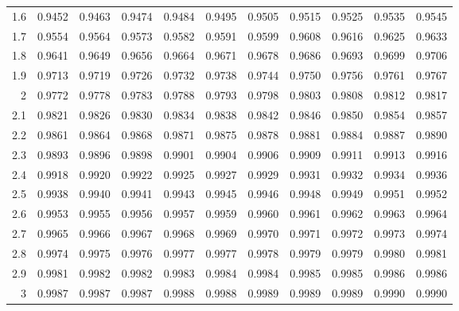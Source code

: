 \documentclass{article}
\begin{document}
\begin{center}
\begin{table}[ht]
\begin{tabular}{rrrrrrrrrrr}
  1.6 & 0.9452 & 0.9463 & 0.9474 & 0.9484 & 0.9495 & 0.9505 & 0.9515 & 0.9525 & 0.9535 & 0.9545 \\ 
  1.7 & 0.9554 & 0.9564 & 0.9573 & 0.9582 & 0.9591 & 0.9599 & 0.9608 & 0.9616 & 0.9625 & 0.9633 \\ 
  1.8 & 0.9641 & 0.9649 & 0.9656 & 0.9664 & 0.9671 & 0.9678 & 0.9686 & 0.9693 & 0.9699 & 0.9706 \\ 
  1.9 & 0.9713 & 0.9719 & 0.9726 & 0.9732 & 0.9738 & 0.9744 & 0.9750 & 0.9756 & 0.9761 & 0.9767 \\ 
  2 & 0.9772 & 0.9778 & 0.9783 & 0.9788 & 0.9793 & 0.9798 & 0.9803 & 0.9808 & 0.9812 & 0.9817 \\ 
  2.1 & 0.9821 & 0.9826 & 0.9830 & 0.9834 & 0.9838 & 0.9842 & 0.9846 & 0.9850 & 0.9854 & 0.9857 \\ 
  2.2 & 0.9861 & 0.9864 & 0.9868 & 0.9871 & 0.9875 & 0.9878 & 0.9881 & 0.9884 & 0.9887 & 0.9890 \\ 
  2.3 & 0.9893 & 0.9896 & 0.9898 & 0.9901 & 0.9904 & 0.9906 & 0.9909 & 0.9911 & 0.9913 & 0.9916 \\ 
  2.4 & 0.9918 & 0.9920 & 0.9922 & 0.9925 & 0.9927 & 0.9929 & 0.9931 & 0.9932 & 0.9934 & 0.9936 \\ 
  2.5 & 0.9938 & 0.9940 & 0.9941 & 0.9943 & 0.9945 & 0.9946 & 0.9948 & 0.9949 & 0.9951 & 0.9952 \\ 
  2.6 & 0.9953 & 0.9955 & 0.9956 & 0.9957 & 0.9959 & 0.9960 & 0.9961 & 0.9962 & 0.9963 & 0.9964 \\ 
  2.7 & 0.9965 & 0.9966 & 0.9967 & 0.9968 & 0.9969 & 0.9970 & 0.9971 & 0.9972 & 0.9973 & 0.9974 \\ 
  2.8 & 0.9974 & 0.9975 & 0.9976 & 0.9977 & 0.9977 & 0.9978 & 0.9979 & 0.9979 & 0.9980 & 0.9981 \\ 
  2.9 & 0.9981 & 0.9982 & 0.9982 & 0.9983 & 0.9984 & 0.9984 & 0.9985 & 0.9985 & 0.9986 & 0.9986 \\ 
  3 & 0.9987 & 0.9987 & 0.9987 & 0.9988 & 0.9988 & 0.9989 & 0.9989 & 0.9989 & 0.9990 & 0.9990 \\ 
   \hline
\end{tabular}
\end{table}
\end{center}



\newpage 
\end{document}
